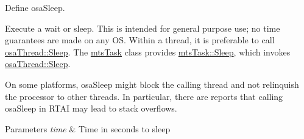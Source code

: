 Define osa\-Sleep. 

Execute a wait or sleep. This is intended for general purpose use; no time guarantees are made on any O\-S. Within a thread, it is preferable to call \hyperlink{classosa_thread_af7490cefd464c7ea87b287f70e4dc833}{osa\-Thread\-::\-Sleep}. The \hyperlink{classmts_task}{mts\-Task} class provides \hyperlink{classmts_task_acaccf2da6d6f8f26c65657656d572131}{mts\-Task\-::\-Sleep}, which invokes \hyperlink{classosa_thread_af7490cefd464c7ea87b287f70e4dc833}{osa\-Thread\-::\-Sleep}.

On some platforms, osa\-Sleep might block the calling thread and not relinquish the processor to other threads. In particular, there are reports that calling osa\-Sleep in R\-T\-A\-I may lead to stack overflows.


\begin{DoxyParams}{Parameters}
{\em time} & Time in seconds to sleep \\
\hline
\end{DoxyParams}
